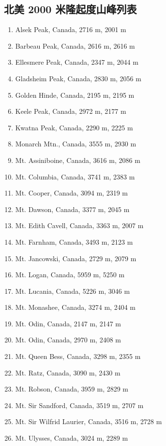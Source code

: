 \documentclass[10pt,twocolumn,letterpaper]{article}
\begin{document}
\subsection{北美 2000 米隆起度山峰列表}

\begin{flushleft}
\begin{enumerate}
    \item Alsek Peak, Canada, 2716 m, 2001 m
    \item Barbeau Peak, Canada, 2616 m, 2616 m
    \item Ellesmere Peak, Canada, 2347 m, 2044 m
    \item Gladsheim Peak, Canada, 2830 m, 2056 m
    \item Golden Hinde, Canada, 2195 m, 2195 m
    \item Keele Peak, Canada, 2972 m, 2177 m
    \item Kwatna Peak, Canada, 2290 m, 2225 m
    \item Monarch Mtn., Canada, 3555 m, 2930 m
    \item Mt. Assiniboine, Canada, 3616 m, 2086 m
    \item Mt. Columbia, Canada, 3741 m, 2383 m
    \item Mt. Cooper, Canada, 3094 m, 2319 m
    \item Mt. Dawson, Canada, 3377 m, 2045 m
    \item Mt. Edith Cavell, Canada, 3363 m, 2007 m
    \item Mt. Farnham, Canada, 3493 m, 2123 m
    \item Mt. Jancowski, Canada, 2729 m, 2079 m
    \item Mt. Logan, Canada, 5959 m, 5250 m
    \item Mt. Lucania, Canada, 5226 m, 3046 m
    \item Mt. Monashee, Canada, 3274 m, 2404 m
    \item Mt. Odin, Canada, 2147 m, 2147 m
    \item Mt. Odin, Canada, 2970 m, 2408 m
    \item Mt. Queen Bess, Canada, 3298 m, 2355 m
    \item Mt. Ratz, Canada, 3090 m, 2430 m
    \item Mt. Robson, Canada, 3959 m, 2829 m
    \item Mt. Sir Sandford, Canada, 3519 m, 2707 m
    \item Mt. Sir Wilfrid Laurier, Canada, 3516 m, 2728 m
    \item Mt. Ulysses, Canada, 3024 m, 2289 m

\end{enumerate}
\end{flushleft}
\end{document}
